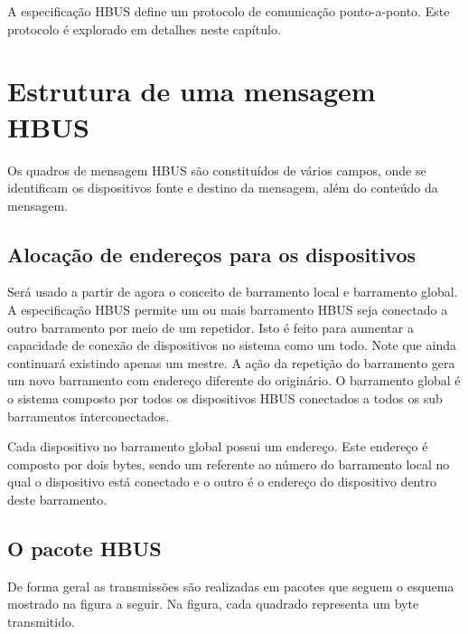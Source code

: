 

A especificação HBUS define um protocolo de comunicação ponto-a-ponto. Este protocolo é explorado em detalhes neste capítulo.

\section{Estrutura de uma mensagem HBUS}

Os quadros de mensagem HBUS são constituídos de vários campos, onde se identificam os dispositivos fonte e destino da mensagem, além do conteúdo da mensagem.

\subsection{Alocação de endereços para os dispositivos}

Será usado a partir de agora o conceito de barramento local e barramento global. A especificação HBUS permite um ou mais barramento HBUS seja conectado a outro barramento por meio de um repetidor. Isto é feito para aumentar a capacidade de conexão de dispositivos no sistema como um todo. Note que ainda continuará existindo apenas um mestre. A ação da repetição do barramento gera um novo barramento com endereço diferente do originário. O barramento global é o sistema composto por todos os dispositivos HBUS conectados a todos os sub barramentos interconectados.

Cada dispositivo no barramento global possui um endereço. Este endereço é composto por dois bytes, sendo um referente ao número do barramento local no qual o dispositivo está conectado e o outro é o endereço do dispositivo dentro deste barramento.

\subsection{O pacote HBUS}

De forma geral as transmissões são realizadas em pacotes que seguem o esquema mostrado na figura a seguir. Na figura, cada quadrado representa um byte transmitido.

\newcommand{\SDSTR}{Endereço do \\ disp. fonte}
\newcommand{\TDSTR}{Endereço do \\ disp. alvo}
\newcommand{\CMDSTR}{Comando}
\newcommand{\TERMSTR}{Fim}
\newcommand{\DATASTR}{Dados}
\newcommand{\ADDRSTR}{Endereço}
\newcommand{\SIZESTR}{Tamanho}


